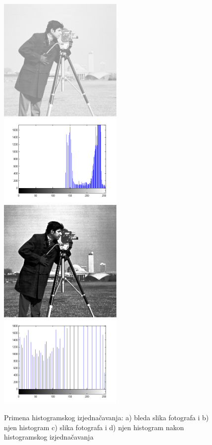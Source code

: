 \documentclass[a4paper,12pt,titlepage]{article}
\begin{document}
\begin{figure}[ht!]
\centering
\includegraphics[width=60mm]{img/imgPow2.png}
\includegraphics[width=60mm]{img/histImgPow2.png}
\includegraphics[width=60mm]{img/histEq.png}
\includegraphics[width=60mm]{img/histEqhist.png}
\caption{Primena histogramskog izjednačavanja: a) bleda slika fotografa i b) njen histogram c) slika fotografa i d) njen histogram nakon histogramskog izjednačavanja}
\label{histeq}
\end{figure}
\end{document}
